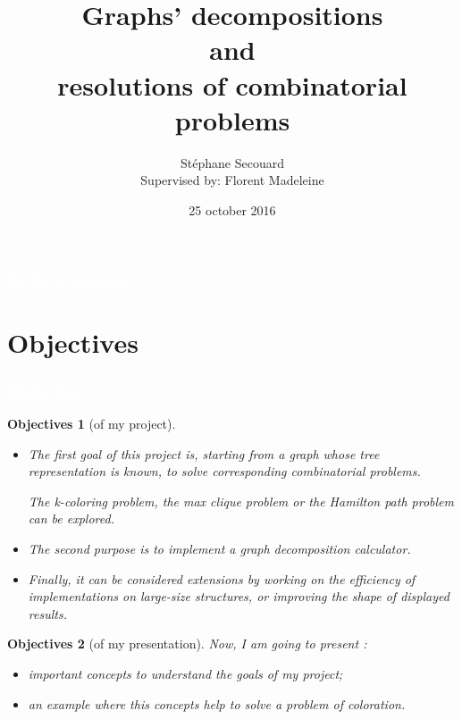 \documentclass[8pt]{beamer}
\title[Graphs' decompositions\\ and \\ resolutions of combinatorial problems]{Graphs' decompositions\\ and \\ resolutions of combinatorial problems}
\author[Stéphane Secouard]{\small {Stéphane Secouard\\ \footnotesize Supervised by: Florent Madeleine}}
\institute[Caen University]{\textbf {Caen University - Computer science }}
\date{25 october 2016}
\newtheorem*{obj}{Objectives}
\begin{document}
\begin{frame}

  \titlepage
\end{frame}


\begin{frame}

  \frametitle{ \textcolor{white}{Table of contents}}

  \tableofcontents

\end{frame}







\section{Objectives}

\begin{frame}
  \frametitle{ \textcolor{white}{Objectives}}

  \begin{obj}[of my project]
  \begin{itemize}
  \item The first goal of this project is, starting from a graph whose  tree representation is known, to solve corresponding combinatorial problems.

    The k-coloring problem, the max clique problem or the Hamilton path problem can be explored.

\item The second purpose is to implement a graph decomposition calculator.

\item Finally, it can be considered extensions by working on the efficiency of implementations on large-size structures, or improving the shape of displayed results.
  \end{itemize}
  \end{obj}

  \begin{obj}[of my presentation]
    Now, I am going to present :
    \begin{itemize}
    \item important concepts to understand the goals of my project;
    \item an example where this concepts help to solve a problem of coloration.
    \end{itemize}
    \end{obj}
\end{frame}
\end{document}
